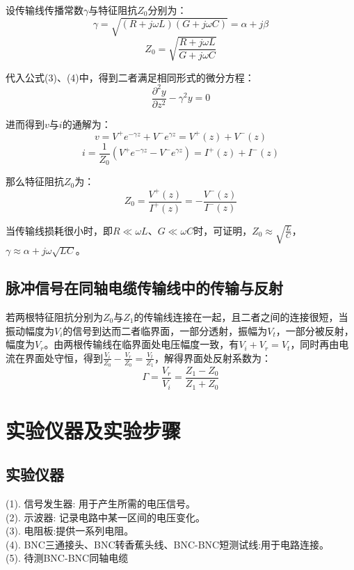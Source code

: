 \documentclass[UTF8]{ctexart}
\begin{document}
设传输线传播常数$\gamma$与特征阻抗$Z_0$分别为：
\begin{equation}
\gamma=\sqrt{(R+j\omega L)(G+j\omega C)}=\alpha+j\beta
\end{equation}
\begin{equation}
Z_0=\sqrt{\frac{R+j\omega L}{G+j\omega C}}
\end{equation}

代入公式(3)、(4)中，得到二者满足相同形式的微分方程：
\begin{equation}
\frac{\partial^2y}{\partial z^2}-\gamma^2y=0
\end{equation}

进而得到$v$与$i$的通解为：
\begin{equation}
v=V^+e^{-\gamma z}+V^-e^{\gamma z}=V^+(z)+V^-(z)
\end{equation}
\begin{equation}
i=\frac{1}{Z_0}(V^+e^{-\gamma z}-V^-e^{\gamma z})=I^+(z)+I^-(z)
\end{equation}

那么特征阻抗$Z_0$为：
\begin{equation}
Z_0=\frac{V^+(z)}{I^+(z)}=-\frac{V^-(z)}{I^-(z)}
\end{equation}

当传输线损耗很小时，即$R\ll\omega L$、$G\ll\omega C$时，可证明，$Z_0\approx\sqrt{\frac{L}{C}}$，$\gamma\approx\alpha+j\omega\sqrt{LC}$。
\subsection{脉冲信号在同轴电缆传输线中的传输与反射}
若两根特征阻抗分别为$Z_0$与$Z_1$的传输线连接在一起，且二者之间的连接很短，当振动幅度为$V_i$的信号到达而二者临界面，一部分透射，振幅为$V_t$，一部分被反射，幅度为$V_r$。由两根传输线在临界面处电压幅度一致，有$V_i+V_r=V_t$，同时再由电流在界面处守恒，得到$\frac{V_i}{Z_0}-\frac{V_r}{Z_0}=\frac{V_t}{Z_1}$，解得界面处反射系数为：
\begin{equation}
\Gamma=\frac{V_r}{V_i}=\frac{Z_1-Z_0}{Z_1+Z_0}
\end{equation}


\section{实验仪器及实验步骤}
\subsection{实验仪器}
\noindent
(1). 信号发生器: 用于产生所需的电压信号。\\
(2). 示波器: 记录电路中某一区间的电压变化。\\
(3). 电阻板:提供一系列电阻。\\
(4). BNC三通接头、BNC转香蕉头线、BNC-BNC短测试线:用于电路连接。\\
(5). 待测BNC-BNC同轴电缆
\end{document}
